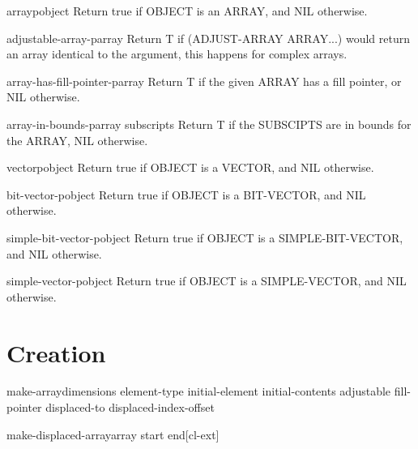 \documentclass[10pt,english]{book}
\begin{document}
\begin{function}{arrayp}{object}
  Return true if OBJECT is an ARRAY, and NIL otherwise.
\end{function}

\begin{function}{adjustable-array-p}{array}
  Return T if (ADJUST-ARRAY ARRAY...) would return an array identical
   to the argument, this happens for complex arrays.
\end{function}

\begin{function}{array-has-fill-pointer-p}{array}
  Return T if the given ARRAY has a fill pointer, or NIL otherwise.
\end{function}

\begin{function}{array-in-bounds-p}{array \rest subscripts}
  Return T if the SUBSCIPTS are in bounds for the ARRAY, NIL otherwise.
\end{function}

\begin{function}{vectorp}{object}
  Return true if OBJECT is a VECTOR, and NIL otherwise.
\end{function}

\begin{function}{bit-vector-p}{object}
  Return true if OBJECT is a BIT-VECTOR, and NIL otherwise.
\end{function}

\begin{function}{simple-bit-vector-p}{object}
  Return true if OBJECT is a SIMPLE-BIT-VECTOR, and NIL otherwise.
\end{function}

\begin{function}{simple-vector-p}{object}
  Return true if OBJECT is a SIMPLE-VECTOR, and NIL otherwise.
\end{function}

\section{Creation}
\label{sec:array-creation}

\begin{function}{make-array}{dimensions \key element-type initial-element initial-contents adjustable
 fill-pointer displaced-to displaced-index-offset}
  
\end{function}

\begin{function}{make-displaced-array}{array \op start end}[cl-ext]
  
\end{function}
\end{document}
